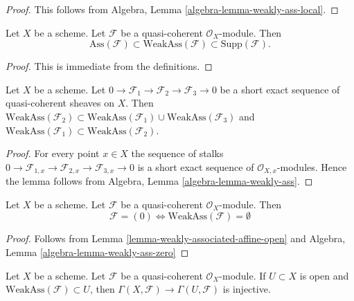 \begin{proof}
This follows from
Algebra, Lemma \ref{algebra-lemma-weakly-ass-local}.
\end{proof}

\begin{lemma}
\label{lemma-weakly-ass-support}
Let $X$ be a scheme.
Let $\mathcal{F}$ be a quasi-coherent $\mathcal{O}_X$-module.
Then
$$
\text{Ass}(\mathcal{F}) \subset \text{WeakAss}(\mathcal{F}) \subset
\text{Supp}(\mathcal{F}).
$$
\end{lemma}

\begin{proof}
This is immediate from the definitions.
\end{proof}

\begin{lemma}
\label{lemma-ses-weakly-ass}
Let $X$ be a scheme.
Let $0 \to \mathcal{F}_1 \to \mathcal{F}_2 \to \mathcal{F}_3 \to 0$
be a short exact sequence of quasi-coherent sheaves on $X$.
Then
$\text{WeakAss}(\mathcal{F}_2) \subset
\text{WeakAss}(\mathcal{F}_1) \cup \text{WeakAss}(\mathcal{F}_3)$
and
$\text{WeakAss}(\mathcal{F}_1) \subset \text{WeakAss}(\mathcal{F}_2)$.
\end{lemma}

\begin{proof}
For every point $x \in X$ the sequence of stalks
$0 \to \mathcal{F}_{1, x} \to \mathcal{F}_{2, x} \to \mathcal{F}_{3, x} \to 0$
is a short exact sequence of $\mathcal{O}_{X, x}$-modules.
Hence the lemma follows from
Algebra, Lemma \ref{algebra-lemma-weakly-ass}.
\end{proof}

\begin{lemma}
\label{lemma-weakly-ass-zero}
Let $X$ be a scheme.
Let $\mathcal{F}$ be a quasi-coherent $\mathcal{O}_X$-module.
Then
$$
\mathcal{F} = (0) \Leftrightarrow \text{WeakAss}(\mathcal{F}) = \emptyset
$$
\end{lemma}

\begin{proof}
Follows from
Lemma \ref{lemma-weakly-associated-affine-open}
and
Algebra, Lemma \ref{algebra-lemma-weakly-ass-zero}
\end{proof}

\begin{lemma}
\label{lemma-restriction-injective-open-contains-weakly-ass}
Let $X$ be a scheme. Let $\mathcal{F}$ be a quasi-coherent
$\mathcal{O}_X$-module. If $U \subset X$ is open and
$\text{WeakAss}(\mathcal{F}) \subset U$, then
$\Gamma(X, \mathcal{F}) \to \Gamma(U, \mathcal{F})$
is injective.
\end{lemma}

